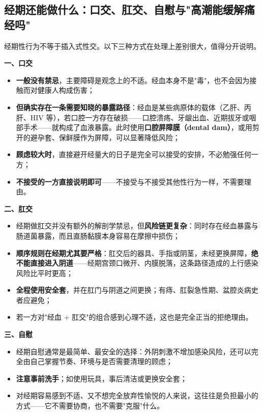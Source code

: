 \subsection{经期还能做什么：口交、肛交、自慰与"高潮能缓解痛经吗"}

经期性行为不等于插入式性交。以下三种方式在处理上差别很大，值得分开说明。

\textbf{一、口交}

\begin{itemize}
\item \textbf{一般没有禁忌}，主要障碍是观念上的不适。经血本身不是"毒"，也不会因为接触而对健康人构成伤害；
\item \textbf{但确实存在一条需要知晓的暴露路径}：经血是某些病原体的载体（乙肝、丙肝、HIV 等），若口腔一方存在破损——口腔溃疡、牙龈出血、近期拔牙或咽部手术——就构成了血液暴露。此时使用\textbf{口腔屏障膜（dental dam）}，或用剪开的避孕套、保鲜膜作为屏障，可以显著降低风险；
\item \textbf{顾虑较大时}，直接避开经量大的日子是完全可以接受的安排，不必勉强任何一方；
\item \textbf{不接受的一方直接说明即可}——不接受与不接受其他性行为一样，不需要理由。
\end{itemize}

\textbf{二、肛交}

\begin{itemize}
\item 经期做肛交并没有额外的解剖学禁忌，但\textbf{风险链更复杂}：同时存在经血暴露与肠道菌暴露，而且直肠黏膜本身容易在摩擦中损伤；
\item \textbf{顺序规则在经期尤其要严格}：肛交后的器具、手指或阴茎，未经更换屏障，\textbf{绝不能直接进入阴道}——经期宫颈口微开、内膜脱落，这条路径造成的上行感染风险比平时更高；
\item \textbf{全程使用安全套}，并在肛门与阴道之间更换；有痔、肛裂急性期、盆腔炎病史者应避免；
\item 若一方对"经血 + 肛交"的组合感到心理不适，这也是完全正当的拒绝理由。
\end{itemize}

\textbf{三、自慰}

\begin{itemize}
\item 经期自慰通常是最简单、最安全的选择：外阴刺激不增加感染风险，还可以完全由自己掌握节奏、环境与是否需要清理的顾虑；
\item \textbf{注意事前洗手}；如使用玩具，事后清洁或更换安全套；
\item 对经期容易感到不适、又不想完全放弃性愉悦的人来说，这往往是负担最小的方式——它不需要协商，也不需要"克服"什么。
\end{itemize}

